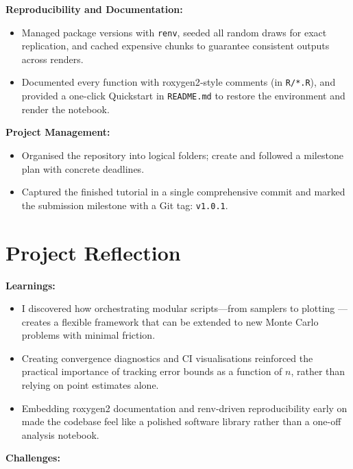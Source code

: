 \documentclass[a4paper, 12pt]{article}
\begin{document}
\textbf{Reproducibility and Documentation:} 
\begin{itemize}
  \item Managed package versions with \texttt{renv}, 
  seeded all random draws for exact replication, and cached expensive chunks 
  to guarantee consistent outputs across renders.
  \item Documented every function with roxygen2‐style comments (in \texttt{R/*.R}), 
  and provided a one-click Quickstart in \texttt{README.md} to restore the environment 
  and render the notebook.
\end{itemize}

\textbf{Project Management:} 
\begin{itemize}
  \item Organised the repository into logical folders; create and followed  
  a milestone plan with concrete deadlines.
  \item Captured the finished tutorial in a single comprehensive commit and 
  marked the submission milestone with a  Git tag: \texttt{v1.0.1}.
\end{itemize}

\pagebreak

\section{Project Reflection}

\textbf{Learnings:}

\begin{itemize}
    \item I discovered how orchestrating modular scripts—from samplers to plotting — 
    creates a flexible framework that can be extended to new Monte Carlo problems with minimal friction.
    \item Creating convergence diagnostics and CI visualisations reinforced the 
    practical importance of tracking error bounds as a function of $n$, 
    rather than relying on point estimates alone.
    \item Embedding roxygen2 documentation and renv‐driven reproducibility early on 
    made the codebase feel like a polished software library rather than a one-off analysis notebook.
\end{itemize}


\textbf{Challenges:}
\end{document}
